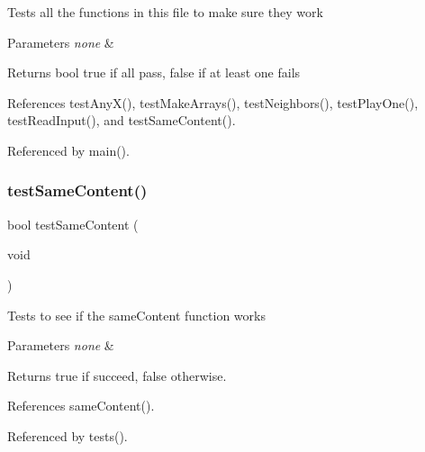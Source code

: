 Tests all the functions in this file to make sure they work 
\begin{DoxyParams}{Parameters}
{\em none} & \\
\hline
\end{DoxyParams}
\begin{DoxyReturn}{Returns}
bool true if all pass, false if at least one fails 
\end{DoxyReturn}


References test\+Any\+X(), test\+Make\+Arrays(), test\+Neighbors(), test\+Play\+One(), test\+Read\+Input(), and test\+Same\+Content().



Referenced by main().

\mbox{\label{tests_8h_a7017056d6783f53023d1f1f0336d3d3e}} 
\subsubsection{test\+Same\+Content()}
{\footnotesize\ttfamily bool test\+Same\+Content (\begin{DoxyParamCaption}\item[{void}]{ }\end{DoxyParamCaption})}

Tests to see if the same\+Content function works 
\begin{DoxyParams}{Parameters}
{\em none} & \\
\hline
\end{DoxyParams}
\begin{DoxyReturn}{Returns}
true if succeed, false otherwise. 
\end{DoxyReturn}


References same\+Content().



Referenced by tests().

